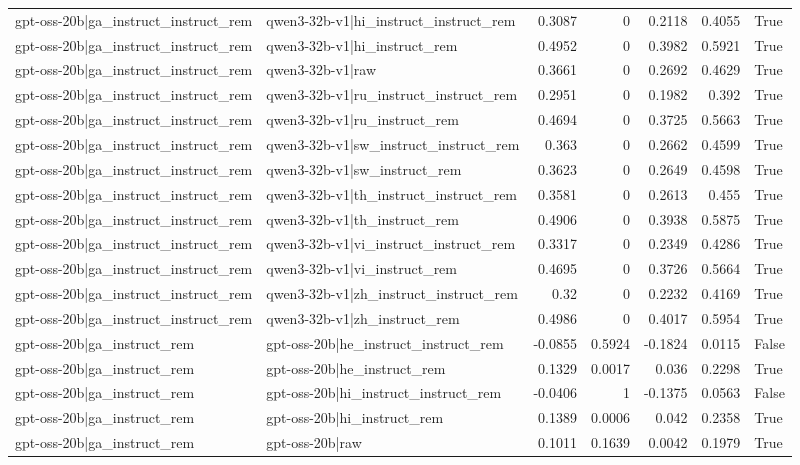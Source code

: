 \begin{table}
\begin{tabular}{l l r r r r l}
gpt-oss-20b|ga_instruct_instruct_rem & qwen3-32b-v1|hi_instruct_instruct_rem & 0.3087 & 0 & 0.2118 & 0.4055 & True \\
gpt-oss-20b|ga_instruct_instruct_rem & qwen3-32b-v1|hi_instruct_rem & 0.4952 & 0 & 0.3982 & 0.5921 & True \\
gpt-oss-20b|ga_instruct_instruct_rem & qwen3-32b-v1|raw & 0.3661 & 0 & 0.2692 & 0.4629 & True \\
gpt-oss-20b|ga_instruct_instruct_rem & qwen3-32b-v1|ru_instruct_instruct_rem & 0.2951 & 0 & 0.1982 & 0.392 & True \\
gpt-oss-20b|ga_instruct_instruct_rem & qwen3-32b-v1|ru_instruct_rem & 0.4694 & 0 & 0.3725 & 0.5663 & True \\
gpt-oss-20b|ga_instruct_instruct_rem & qwen3-32b-v1|sw_instruct_instruct_rem & 0.363 & 0 & 0.2662 & 0.4599 & True \\
gpt-oss-20b|ga_instruct_instruct_rem & qwen3-32b-v1|sw_instruct_rem & 0.3623 & 0 & 0.2649 & 0.4598 & True \\
gpt-oss-20b|ga_instruct_instruct_rem & qwen3-32b-v1|th_instruct_instruct_rem & 0.3581 & 0 & 0.2613 & 0.455 & True \\
gpt-oss-20b|ga_instruct_instruct_rem & qwen3-32b-v1|th_instruct_rem & 0.4906 & 0 & 0.3938 & 0.5875 & True \\
gpt-oss-20b|ga_instruct_instruct_rem & qwen3-32b-v1|vi_instruct_instruct_rem & 0.3317 & 0 & 0.2349 & 0.4286 & True \\
gpt-oss-20b|ga_instruct_instruct_rem & qwen3-32b-v1|vi_instruct_rem & 0.4695 & 0 & 0.3726 & 0.5664 & True \\
gpt-oss-20b|ga_instruct_instruct_rem & qwen3-32b-v1|zh_instruct_instruct_rem & 0.32 & 0 & 0.2232 & 0.4169 & True \\
gpt-oss-20b|ga_instruct_instruct_rem & qwen3-32b-v1|zh_instruct_rem & 0.4986 & 0 & 0.4017 & 0.5954 & True \\
gpt-oss-20b|ga_instruct_rem & gpt-oss-20b|he_instruct_instruct_rem & -0.0855 & 0.5924 & -0.1824 & 0.0115 & False \\
gpt-oss-20b|ga_instruct_rem & gpt-oss-20b|he_instruct_rem & 0.1329 & 0.0017 & 0.036 & 0.2298 & True \\
gpt-oss-20b|ga_instruct_rem & gpt-oss-20b|hi_instruct_instruct_rem & -0.0406 & 1 & -0.1375 & 0.0563 & False \\
gpt-oss-20b|ga_instruct_rem & gpt-oss-20b|hi_instruct_rem & 0.1389 & 0.0006 & 0.042 & 0.2358 & True \\
gpt-oss-20b|ga_instruct_rem & gpt-oss-20b|raw & 0.1011 & 0.1639 & 0.0042 & 0.1979 & True \\

\end{tabular}
\end{table}
